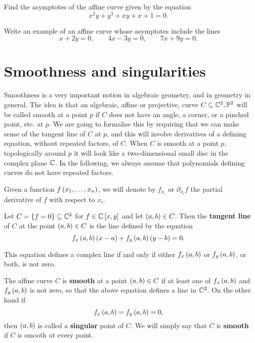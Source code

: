 \begin{exercise**}
Find the asymptotes of the affine curve given by the equation
$$ x^2y + y^3 + xy + x + 1 = 0. $$
\end{exercise**}

\begin{exercise**}
Write an example of an affine curve whose asymptotes include the lines
$$ x + 2y = 0, \qquad 4x - 3y = 0, \qquad 7x + 9y = 0. $$
\end{exercise**}

\pagebreak

\section{Smoothness and singularities}


Smoothness is a very important notion in algebraic geometry, and in geometry in general. The idea is that an algebraic, affine or projective, curve $ C \subseteq \mathbb{C}^2, \mathbb{P}^2 $ will be called smooth at a point $ p $ if $ C $ does not have an angle, a corner, or a pinched point, etc. at $ p $. We are going to formalise this by requiring that we can make sense of the tangent line of $ C $ at $ p $, and this will involve derivatives of a defining equation, without repeated factors, of $ C $. When $ C $ is smooth at a point $ p $, topologically around $ p $ it will look like a two-dimensional small disc in the complex plane $ \mathbb{C} $. In the following, we always assume that polynomials defining curves do not have repeated factors.

\begin{notation}
Given a function $ f\br{x_1, \dots, x_n} $, we will denote by $ f_{x_i} $ or $ \partial_{x_i}f $ the partial derivative of $ f $ with respect to $ x_i $.
\end{notation}

Let $ C = \cbr{f = 0} \subseteq \CC^2 $ for $ f \in \CC\sbr{x, y} $ and let $ \br{a, b} \in C $. Then the \textbf{tangent line} of $ C $ at the point $ \br{a, b} \in C $ is the line defined by the equation
$$ f_x\br{a, b}\br{x - a} + f_y\br{a, b}\br{y - b} = 0. $$

\begin{note*}
This equation defines a complex line if and only if either $ f_x\br{a, b} $ or $ f_y\br{a, b} $, or both, is not zero.
\end{note*}

\begin{definition}
The affine curve $ C $ is \textbf{smooth} at a point $ \br{a, b} \in C $ if at least one of $ f_x\br{a, b} $ and $ f_y\br{a, b} $ is not zero, so that the above equation defines a line in $ \mathbb{C}^2 $. On the other hand if
$$ f_x\br{a, b} = f_y\br{a, b} = 0, $$
then $ \br{a, b} $ is called a \textbf{singular} point of $ C $. We will simply say that $ C $ is \textbf{smooth} if $ C $ is smooth at every point.
\end{definition}

